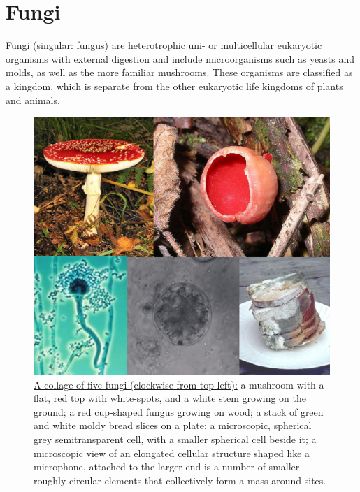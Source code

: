 \hypertarget{fungi}{%
\chapter{Fungi}\label{fungi}}

Fungi (singular: fungus) are heterotrophic uni- or multicellular eukaryotic organisms with external digestion and include microorganisms such as yeasts and molds, as well as the more familiar mushrooms. These organisms are classified as a kingdom, which is separate from the other eukaryotic life kingdoms of plants and animals.



\begin{figure}

{\centering \includegraphics[width=0.7\linewidth]{./figures/fungi/Fungi_collage} 

}

\caption{\href{https://commons.wikimedia.org/wiki/File:Fungi_collage.jpg}{A collage of five fungi (clockwise from top-left):} a mushroom with a flat, red top with white-spots, and a white stem growing on the ground; a red cup-shaped fungus growing on wood; a stack of green and white moldy bread slices on a plate; a microscopic, spherical grey semitransparent cell, with a smaller spherical cell beside it; a microscopic view of an elongated cellular structure shaped like a microphone, attached to the larger end is a number of smaller roughly circular elements that collectively form a mass around sites.}\label{fig:fungidiversity}
\end{figure}


